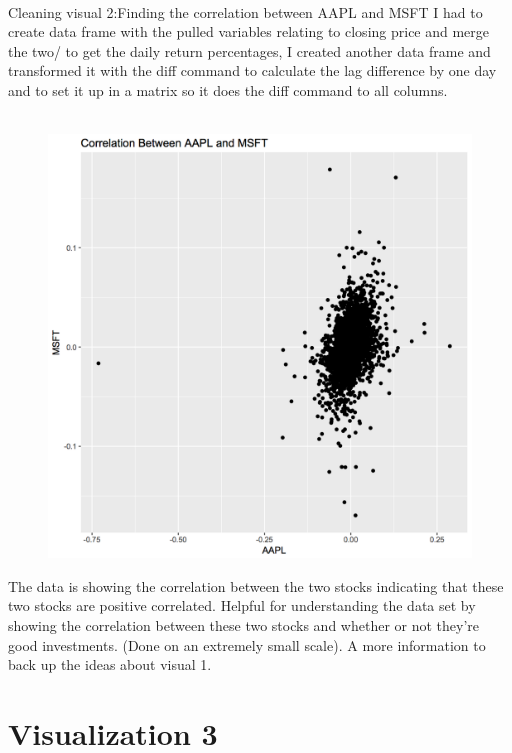 \documentclass{article}
\begin{document}
\newpage
\\
Cleaning visual 2:Finding the correlation between AAPL and MSFT
I had to create data frame with the pulled variables relating to closing price and merge the two/ to get the daily return percentages, I created another data frame and transformed it with the diff command to calculate the lag difference by one day and to set it up in a matrix so it does the diff command to all columns. \\
\\
\begin{figure}[H]
    \centering
    \includegraphics[scale=.8]{Visual_2_2_PS6.png}
\end{figure}
\newpage

The data is showing the correlation between the two stocks indicating that these two stocks are positive correlated. Helpful for understanding  the data set by showing the correlation between these two stocks and whether or not they're good investments. (Done on an extremely small scale). A more information to back up the ideas about visual 1.

\section{Visualization 3}
\end{document}
